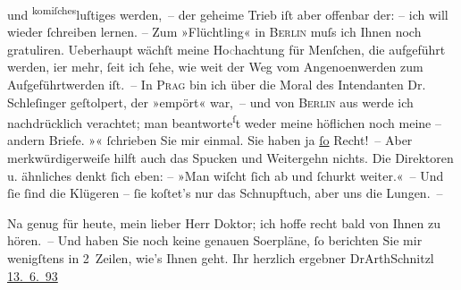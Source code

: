                und \substVorne{}\textsuperscript{komiſches}\substDazwischen{}luſtiges\substHinten{} werden, – der geheime Trieb iſt aber offenbar der: – ich will wieder{ }ſchreiben lernen. – Zum »Flüchtling« in \textsc{Berlin} muſs ich Ihnen
               noch gratuliren. Ueberhaupt wächſt meine Ho\textcolor{gray}{c}hachtung für Menſchen, die aufgeführt
               werden, i{\geminationm}er mehr,{ }ſeit ich{ }ſehe, wie weit der Weg vom
                  Angeno{\geminationm}enwerden zum Aufgeführtwerden iſt. – {\pb}In \textsc{Prag} bin ich über die
               Moral des Intendanten Dr. Schleſinger
               geſtolpert, der \label{T_L03944-1v}\label{T_L03944-1} »empört« war, – und von \textsc{Berlin} aus werde ich nachdrücklich verachtet; man beantworte\substVorne{}\textsuperscript{ſ}\substDazwischen{}t\substHinten{} weder meine
               höflichen noch meine – andern Briefe. »\label{K_L03944-7v}\label{K_L03944-7}«{ }ſchrieben Sie mir einmal.
               Sie haben ja \uline{ſo} Recht! – Aber merkwürdigerweiſe hilft
               auch das Spucken und Weitergehn nichts. Die Direktoren u. ähnliches denkt {\pb}ſich eben:
               – »Man wiſcht{ }ſich ab und{ }ſchurkt weiter.« – Und{ }ſie{ }ſind die Klügeren –{ }ſie koſtet’s
               nur das Schnupftuch, aber uns die Lungen. –\pend
           
\pstart
           Na genug für heute, mein lieber Herr Doktor; ich hoffe recht bald von Ihnen zu hören. –
               Und haben Sie noch keine genauen So{\geminationm}erpläne,{ }ſo berichten Sie mir wenigſtens in
               2 Zeilen, wie’s Ihnen geht.\pend
           \pstart {\pb}Ihr herzlich ergebner \spacefill\mbox{DrArthSchnitzl}\pend{}
\pstart
           \uline{13. 6. 93}\pend
           \endnumbering{}  \newcommand{\dateiname}{L03944}\newcommand{\titel}{Arthur Schnitzler an Theodor Herzl, 13. 6. 1893}\newcommand{\editorInnen}{Herausgegeben von Jahnke, SelmaMüller, Martin Anton}
